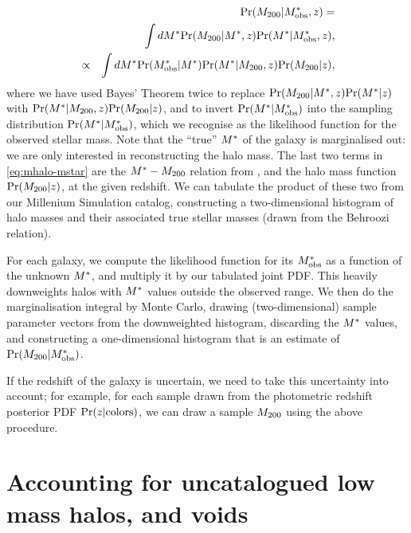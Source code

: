 \documentclass[useAMS,usenatbib]{mn2e}
\begin{document}
\begin{eqnarray}
&& \Pr(\Mhalo|\Mstarobs,z) = \notag\\
&& \int d\Mstar \Pr(\Mhalo|\Mstar,z) \Pr(\Mstar|\Mstarobs,z), \notag\\
&\propto& \int d\Mstar \Pr(\Mstarobs|\Mstar) \Pr(\Mstar|\Mhalo,z) \Pr(\Mhalo|z),
\label{eq:mhalo-mstar}
\end{eqnarray}
where we have used Bayes' Theorem twice to replace
$\Pr(\Mhalo|\Mstar,z) \Pr(\Mstar|z)$ with 
$\Pr(\Mstar|\Mhalo,z) \Pr(\Mhalo|z)$, and 
to invert $\Pr(\Mstar|\Mstarobs)$ into the sampling
distribution $\Pr(\Mstar|\Mstarobs)$, which we recognise as the likelihood
function for the observed stellar mass. Note that the ``true'' $\Mstar$ of the
galaxy is marginalised out: we are only interested in reconstructing the halo
mass. The last two terms in
\eqref{eq:mhalo-mstar} are the $\Mstar-\Mhalo$ relation from
\citet{BehrooziEtal2010}, and the halo mass function $\Pr(\Mhalo|z)$, at the
given redshift. We can
tabulate the product of these two from our Millenium Simulation catalog,
constructing a two-dimensional histogram of halo masses and their associated
true stellar masses (drawn from the Behroozi relation). 

For each galaxy, we compute the likelihood function for its $\Mstarobs$ as a
function of the unknown $\Mstar$, and multiply it by our tabulated joint PDF.
This heavily downweights halos with $\Mstar$ values outside the observed
range. We then do the marginalisation integral by Monte Carlo, drawing
(two-dimensional) sample parameter vectors
from the downweighted histogram, discarding the $\Mstar$ values, and
constructing a one-dimensional histogram that is an estimate of
$\Pr(\Mhalo|\Mstarobs)$.


If the redshift of the galaxy is uncertain, we need to take this uncertainty
into account; for example, for each sample drawn from the photometric redshift
posterior PDF $\Pr(z|{\rm colors})$, we can draw a sample $\Mhalo$ using the
above procedure.



\section{Accounting for uncatalogued low mass halos, and voids}
\label{appendix:smooth}
\end{document}
